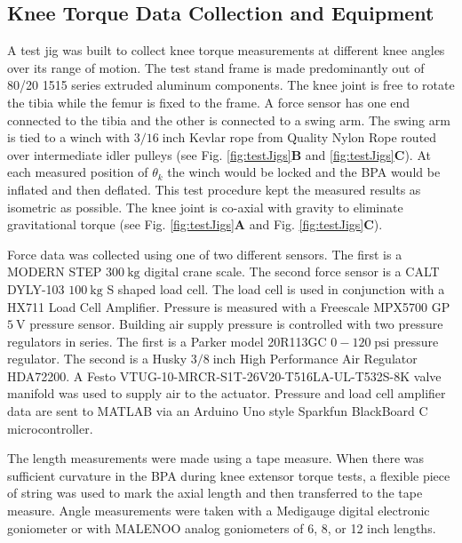 \subsection{Knee Torque Data Collection and Equipment}\label{sec:torque_equipment}


A test jig was built to collect knee torque measurements at different knee angles over its range of motion. The test stand frame is made predominantly out of 80/20 1515 series extruded aluminum components. The knee joint is free to rotate the tibia while the femur is fixed to the frame. A force sensor has one end connected to the tibia and the other is connected to a swing arm. The swing arm is tied to a winch with $3/16\; \text{inch}$ Kevlar rope from Quality Nylon Rope routed over intermediate idler pulleys (see Fig. \ref{fig:testJigs}\textbf{B} and \ref{fig:testJigs}\textbf{C}). At each measured position of $\theta_{k}$ the winch would be locked and the BPA would be inflated and then deflated. This test procedure kept the measured results as isometric as possible.  The knee joint is co-axial with gravity to eliminate gravitational torque (see Fig. \ref{fig:testJigs}\textbf{A} and Fig. \ref{fig:testJigs}\textbf{C}).

Force data was collected using one of two different sensors. The first is a MODERN STEP $\qty{300}{\kilo\gram}$ digital crane scale. The second force sensor is a CALT DYLY-103 $\qty{100}{\kilo\gram}$ S shaped load cell. The load cell is used in conjunction with a HX711 Load Cell Amplifier. Pressure is measured with a Freescale MPX5700 GP $\qty{5}{\volt}$ pressure sensor. Building air supply pressure is controlled with two pressure regulators in series. The first is a Parker model 20R113GC $0-120\; \text{psi}$ pressure regulator. The second is a Husky $3/8 \; \text{inch}$ High Performance Air Regulator HDA72200. A Festo VTUG-10-MRCR-S1T-26V20-T516LA-UL-T532S-8K valve manifold was used to supply air to the actuator. Pressure and load cell amplifier data are sent to MATLAB via an Arduino Uno style Sparkfun BlackBoard C microcontroller. 


The length measurements were made using a tape measure. When there was sufficient curvature in the BPA during knee extensor torque tests, a flexible piece of string was used to mark the axial length and then transferred to the tape measure. Angle measurements were taken with a Medigauge digital electronic goniometer or with MALENOO analog goniometers of 6, 8, or 12 inch lengths.  

